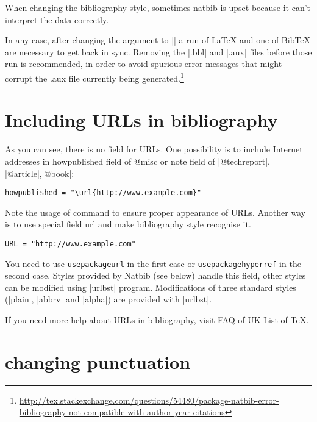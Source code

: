 When changing the bibliography style, sometimes natbib is upset because it can't interpret the data correctly.

In any case, after changing the argument to || a run of LaTeX and one of BibTeX are necessary to get back in sync. Removing the |.bbl| and |.aux| files before those run is recommended, in order to avoid spurious error messages that might corrupt the .aux file currently being generated.\footnote{\url{http://tex.stackexchange.com/questions/54480/package-natbib-error-bibliography-not-compatible-with-author-year-citations}}

\section{Including URLs in bibliography}

As you can see, there is no field for URLs. One possibility is to include Internet addresses in howpublished field of @misc or note field of |@techreport|, |@article|,|@book|:

\begin{lstlisting}[language={[common]TeX},% 
                           alsolanguage={[LaTeX]TeX},% 
                           alsolanguage={[primitive]TeX},%
                           ]
howpublished = "\url{http://www.example.com}"
\end{lstlisting}

Note the usage of  command to ensure proper appearance of URLs.
Another way is to use special field url and make bibliography style recognise it.

\begin{lstlisting}[language={[common]TeX},% 
                           alsolanguage={[LaTeX]TeX},% 
                           alsolanguage={[primitive]TeX},%
                           ]
URL = "http://www.example.com"
\end{lstlisting}

You need to use \texttt{usepackage{url}} in the first case or \texttt{usepackage{hyperref}} in the second case.
Styles provided by Natbib (see below) handle this field, other styles can be modified using |urlbst| program. Modifications of three standard styles (|plain|, |abbrv| and |alpha|) are provided with |urlbst|.

If you need more help about URLs in bibliography, visit FAQ of UK List of TeX.


\section{changing punctuation}

